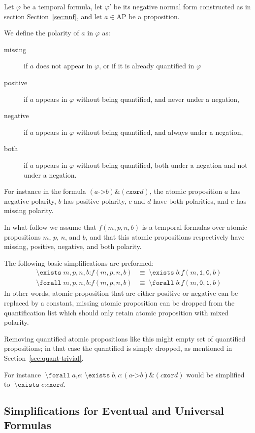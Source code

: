 \documentclass[a4paper,twoside,10pt,DIV=12]{scrreprt}
\newcommand{\AP}{\ensuremath{\mathrm{AP}}}
\newcommand{\XOR}{\mathbin{\texttt{xor}}}
\newcommand{\IMPLIES}{\mathbin{\texttt{->}}}
\newcommand{\AND}{\mathbin{\texttt{\&}}}
\newcommand{\COLON}{\mathbin{\texttt{:}}}
\newcommand{\COMMA}{\mathbin{\texttt{,}}}
\newcommand{\0}{\texttt{0}}
\newcommand{\1}{\texttt{1}}
\DeclareMathOperator{\EXISTS}{\texttt{\textbackslash{}exists}}
\DeclareMathOperator{\FORALL}{\texttt{\textbackslash{}forall}}
\begin{document}
Let $\varphi$ be a temporal formula, let $\varphi'$ be its negative
normal form constructed as in section Section~\ref{sec:nnf}, and let
$a\in \AP$ be a proposition.

We define the polarity of $a$ in $\varphi$ as:
\begin{description}
\item[missing] if $a$ does not appear in $\varphi$, or if it is already
  quantified in $\varphi$
\item[positive] if $a$ appears in $\varphi$ without being quantified,
  and never under a negation,
\item[negative] if $a$ appears in $\varphi$ without being quantified,
  and always under a negation,
\item[both] if $a$ appears in $\varphi$ without being quantified, both
  under a negation and not under a negation.
\end{description}

For instance in the formula $(a \IMPLIES b) \AND (c \XOR d)$, the
atomic proposition $a$ has negative polarity, $b$ has positive polarity,
$c$ and $d$ have both polarities, and $e$ has missing polarity.

In what follow we assume that $f(m,p,n,b)$ is a temporal formulas over
atomic propositions $m$, $p$, $n$, and $b$, and that this atomic
propositions respectively have missing, positive, negative, and both
polarity.

The following basic simplifications are preformed:
\begin{align*}
  \EXISTS m\COMMA\,p\COMMA\,n\COMMA\,b \COLON f(m,p,n,b) &\equiv \EXISTS b \COLON f(m,\1,\0,b) \\
  \FORALL m\COMMA\,p\COMMA\,n\COMMA\,b \COLON f(m,p,n,b) &\equiv \FORALL b \COLON f(m,\0,\1,b)
\end{align*}
In other words, atomic proposition that are either positive or negative can be replaced by a constant,
missing atomic proposition can be dropped from the quantification list which should only retain atomic
proposition with mixed polarity.

Removing quantified atomic propositions like this might empty set of quantified propositions;
in that case the quantified is simply dropped, as mentioned in Section~\ref{sec:quant-trivial}.


For instance  $\FORALL a\COMMA e\COLON \EXISTS b, c\COLON (a \IMPLIES b) \AND (c \XOR d)$
would be simplified to $\EXISTS c\COLON c \XOR d$.


\subsection{Simplifications for Eventual and Universal Formulas}
\label{sec:eventunivrew}
\end{document}
